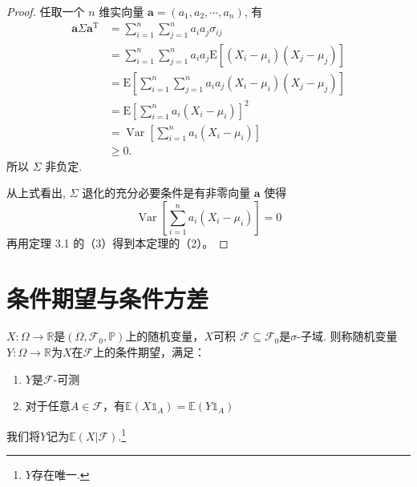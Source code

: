 \begin{proof}
    任取一个 $n$ 维实向量 $\boldsymbol{a}=\left(a_1, a_2, \cdots, a_n\right)$, 有
    $$
        \begin{aligned}
            \boldsymbol{a} \Sigma \boldsymbol{a}^{\mathrm{T}} & =\sum_{i=1}^n \sum_{j=1}^n a_i a_j \sigma_{i j}                                                        \\
                                                              & =\sum_{i=1}^n \sum_{j=1}^n a_i a_j \mathrm{E}\left[\left(X_i-\mu_i\right)\left(X_j-\mu_j\right)\right] \\
                                                              & =\mathrm{E}\left[\sum_{i=1}^n \sum_{j=1}^n a_i a_j\left(X_i-\mu_i\right)\left(X_j-\mu_j\right)\right]  \\
                                                              & =\mathrm{E}\left[\sum_{i=1}^n a_i\left(X_i-\mu_i\right)\right]^2                                       \\
                                                              & =\operatorname{Var}\left[\sum_{i=1}^n a_i\left(X_i-\mu_i\right)\right]                                 \\
                                                              & \geq 0 .
        \end{aligned}
    $$
    所以 $\Sigma$ 非负定.

    从上式看出, $\Sigma$ 退化的充分必要条件是有非零向量 $\boldsymbol{a}$ 使得
    $$
        \operatorname{Var}\left[\sum_{i=1}^n a_i\left(X_i-\mu_i\right)\right]=0
    $$
    再用定理 3.1 的（3）得到本定理的（2）。
\end{proof}

\section{条件期望与条件方差}

\begin{definition}[条件期望]
    $X:\Omega\to \mathbb{R}$是$(\Omega,\mathcal{F}_0,\mathbb{P})$上的随机变量，$X$可积 $\mathcal{F}\subseteq \mathcal{F}_0$是$\sigma$-子域. 则称随机变量$Y:\Omega\to \mathbb{R}$为$X$在$\mathcal{F}$上的条件期望，满足：
    \begin{enumerate}
        \item $Y$是$\mathcal{F}$-可测
        \item 对于任意$A\in\mathcal{F}$，有$\mathbb{E}(X\mathbb{1}_A)=\mathbb{E}(Y\mathbb{1}_A)$
    \end{enumerate}
    我们将$Y$记为$\mathbb{E}(X|\mathcal{F})$.\footnote{$Y$存在唯一.}
\end{definition}

